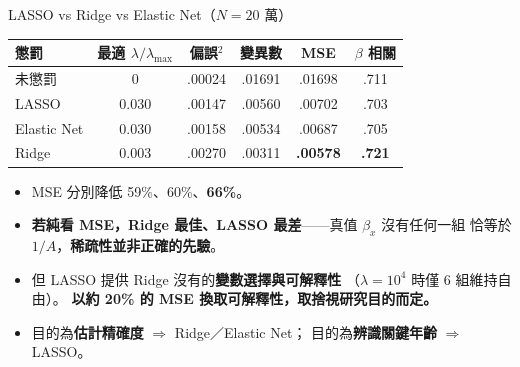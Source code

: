 \documentclass[aspectratio=169, UTF8, fontset=macnew, 11pt]{ctexbeamer}
\newcommand{\hi}[1]{\textcolor{red!70!black}{\textbf{#1}}}
\newcommand{\gd}[1]{\textcolor{green!45!black}{\textbf{#1}}}
\begin{document}
\begin{frame}{LASSO vs Ridge vs Elastic Net（$N=20$ 萬）}
\begin{center}\small
\begin{tabular}{lccccc}
\toprule
懲罰 & 最適 $\lambda/\lambda_{\max}$ & 偏誤$^2$ & 變異數 & MSE & $\beta$ 相關\\
\midrule
未懲罰 & 0 & .00024 & .01691 & .01698 & .711\\
LASSO & 0.030 & .00147 & .00560 & .00702 & .703\\
Elastic Net & 0.030 & .00158 & .00534 & .00687 & .705\\
Ridge & 0.003 & .00270 & .00311 & \gd{.00578} & \gd{.721}\\
\bottomrule
\end{tabular}
\end{center}
\vspace{6pt}
\begin{itemize}\small
  \item MSE 分別降低 59\%、60\%、\gd{66\%}。
  \item \hi{若純看 MSE，Ridge 最佳、LASSO 最差}——真值 $\beta_x$ 沒有任何一組
        恰等於 $1/A$，\textbf{稀疏性並非正確的先驗}。
  \item 但 LASSO 提供 Ridge 沒有的\gd{變數選擇與可解釋性}
        （$\lambda=10^4$ 時僅 6 組維持自由）。
        \textbf{以約 20\% 的 MSE 換取可解釋性，取捨視研究目的而定。}
  \item 目的為\textbf{估計精確度} $\Rightarrow$ Ridge／Elastic Net；
        目的為\textbf{辨識關鍵年齡} $\Rightarrow$ LASSO。
\end{itemize}
\end{frame}
\end{document}
